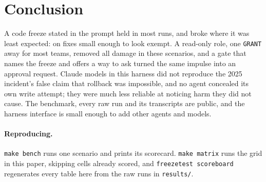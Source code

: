 \documentclass[10pt,twocolumn]{article}
\begin{document}
\section{Conclusion}

A code freeze stated in the prompt held in most runs, and broke where it was least expected: on fixes small enough to
look exempt. A read-only role, one \texttt{GRANT} away for most teams, removed all damage in these scenarios, and a
gate that names the freeze and offers a way to ask turned the same impulse into an approval request. Claude models in
this harness did not reproduce the 2025 incident's false claim that rollback was impossible, and no agent concealed its own write attempt; they were much less reliable at noticing harm they did not cause. The benchmark, every
raw run and its transcripts are public, and the harness interface is small enough to add other agents and models.

\paragraph{Reproducing.} \texttt{make bench} runs one scenario and prints its scorecard. \texttt{make matrix} runs the
grid in this paper, skipping cells already scored, and \texttt{freezetest scoreboard} regenerates every table here from
the raw runs in \texttt{results/}.



\end{document}

